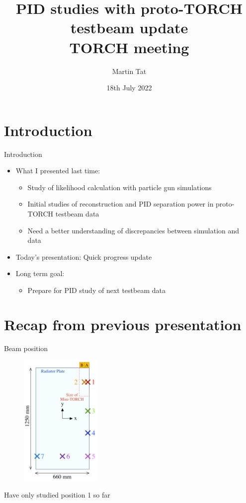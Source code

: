 \documentclass{beamer}
\title[TORCH meeting]{PID studies with proto-TORCH testbeam update\\TORCH meeting}
\author{Martin Tat}
\institute{University of Oxford}
\date{18th July 2022}
\begin{document}
\begin{frame}
  \titlepage
\end{frame}


\section{Introduction}
\begin{frame}{Introduction}
  \begin{itemize}
    \setlength\itemsep{1.0em}
    \item{What I presented last time:}
    \begin{itemize}
      \setlength\itemsep{0.5em}
      \item{Study of likelihood calculation with particle gun simulations}
      \item{Initial studies of reconstruction and PID separation power in proto-TORCH testbeam data}
      \item{Need a better understanding of discrepancies between simulation and data}
    \end{itemize}
    \item{Today's presentation: Quick progress update}
    \item{Long term goal:}
    \begin{itemize}
      \setlength\itemsep{0.5em}
      \item{Prepare for PID study of next testbeam data}
    \end{itemize}
  \end{itemize}
\end{frame}

\section{Recap from previous presentation}
\begin{frame}{Beam position}
  \begin{figure}
    \centering
    \includegraphics[width = 0.35\textwidth]{Plots/BeamPosition.png}
  \end{figure}
  \begin{center}
    \large Have only studied position 1 so far
  \end{center}
\end{frame}
\end{document}
